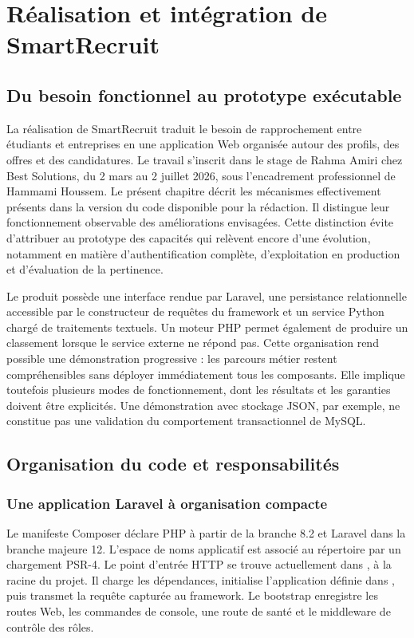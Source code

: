 \chapter{Réalisation et intégration de SmartRecruit}
\label{chap:realisation}

\section{Du besoin fonctionnel au prototype exécutable}

La réalisation de SmartRecruit traduit le besoin de rapprochement entre étudiants et entreprises en une application Web organisée autour des profils, des offres et des candidatures. Le travail s'inscrit dans le stage de Rahma Amiri chez Best Solutions, du 2 mars au 2 juillet 2026, sous l'encadrement professionnel de Hammami Houssem. Le présent chapitre décrit les mécanismes effectivement présents dans la version du code disponible pour la rédaction. Il distingue leur fonctionnement observable des améliorations envisagées. Cette distinction évite d'attribuer au prototype des capacités qui relèvent encore d'une évolution, notamment en matière d'authentification complète, d'exploitation en production et d'évaluation de la pertinence.

Le produit possède une interface rendue par Laravel, une persistance relationnelle accessible par le constructeur de requêtes du framework et un service Python chargé de traitements textuels. Un moteur PHP permet également de produire un classement lorsque le service externe ne répond pas. Cette organisation rend possible une démonstration progressive : les parcours métier restent compréhensibles sans déployer immédiatement tous les composants. Elle implique toutefois plusieurs modes de fonctionnement, dont les résultats et les garanties doivent être explicités. Une démonstration avec stockage JSON, par exemple, ne constitue pas une validation du comportement transactionnel de MySQL.

\section{Organisation du code et responsabilités}

\subsection{Une application Laravel à organisation compacte}

Le manifeste Composer déclare PHP à partir de la branche 8.2 et Laravel dans la branche majeure 12. L'espace de noms applicatif  est associé au répertoire  par un chargement PSR-4. Le point d'entrée HTTP se trouve actuellement dans , à la racine du projet. Il charge les dépendances, initialise l'application définie dans , puis transmet la requête capturée au framework. Le bootstrap enregistre les routes Web, les commandes de console, une route de santé et le middleware de contrôle des rôles.

